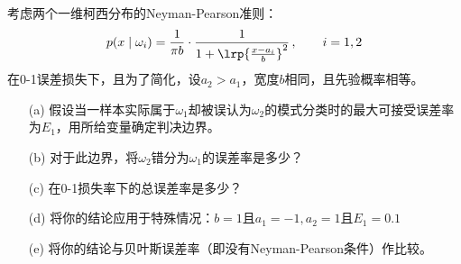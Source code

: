 \documentclass[reportComp]{thesis}
\begin{document}
\begin{question}[\textsection 2 Q7]
考虑两个一维柯西分布的Neyman-Pearson准则：
\[p(x\mid\omega_i)=\frac{1}{\pi b}\cdot\frac{1}{1+\lrp{\frac{x-a_i}{b}}^2}\,,\qquad i=1,2\]
在0-1误差损失下，且为了简化，设$a_2>a_1$，宽度$b$相同，且先验概率相等。
\begin{itemize}
	\item [(a)] 假设当一样本实际属于$\omega_1$却被误认为$\omega_2$的模式分类时的最大可接受误差率为$E_1$，用所给变量确定判决边界。
	\item [(b)] 对于此边界，将$\omega_2$错分为$\omega_1$的误差率是多少？
	\item [(c)] 在0-1损失率下的总误差率是多少？
	\item [(d)] 将你的结论应用于特殊情况：$b=1$且$a_1=-1,a_2=1$且$E_1=0.1$
	\item [(e)] 将你的结论与贝叶斯误差率（即没有Neyman-Pearson条件）作比较。
\end{itemize}
\end{question}
\end{document}
